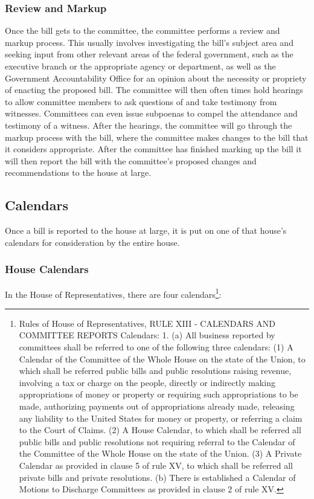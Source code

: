 \subsubsection{Review and Markup}
Once the bill gets to the committee, the committee performs a review and markup process.
This usually involves investigating the bill's subject area and seeking input from other relevant areas of the federal government, such as the executive branch or the appropriate agency or department, as well as the Government Accountability Office for an opinion about the necessity or propriety of enacting the proposed bill.
The committee will then often times hold hearings to allow committee members to ask questions of and take testimony from witnesses.  Committees can even issue subpoenas to compel the attendance and testimony of a witness.
After the hearings, the committee will go through the markup process with the bill, where the committee makes changes to the bill that it considers appropriate.  After the committee has finished marking up the bill it will then report the bill with the committee's proposed changes and recommendations to the house at large.

\subsection{Calendars}
Once a bill is reported to the house at large, it is put on one of that house's calendars for consideration by the entire house.

\subsubsection{House Calendars}
In the House of Representatives, there are four calendars\footnote{Rules of House of Representatives, RULE XIII - CALENDARS AND COMMITTEE REPORTS Calendars:  1. (a) All business reported by committees shall be referred to one of the following three calendars: (1) A Calendar of the Committee of the Whole House on the state of the Union, to which shall be referred public bills and public resolutions raising revenue, involving a tax or charge on the people, directly or indirectly making appropriations of money or property or requiring such appropriations to be made, authorizing payments out of appropriations already made, releasing any liability to the United States for money or property, or referring a claim to the Court of Claims. (2) A House Calendar, to which shall be referred all public bills and public resolutions not requiring referral to the Calendar of the Committee of the Whole House on the state of the Union. (3) A Private Calendar as provided in clause 5 of rule XV, to which shall be referred all private bills and private resolutions. (b) There is established a Calendar of Motions to Discharge Committees as provided in clause 2 of rule XV.}:

